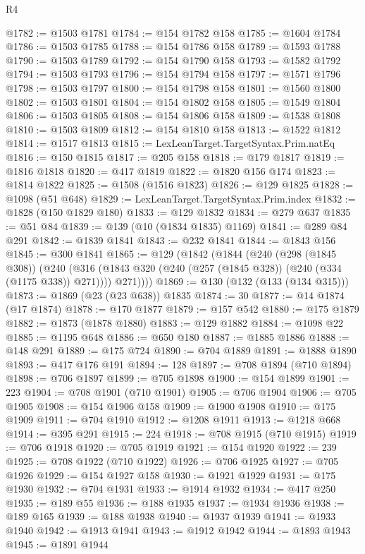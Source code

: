 \begin{lexlean}{R4}
\begin{coremodule}
@1782 := @1503 @1781
@1784 := @154 @1782 @158
@1785 := @1604 @1784
@1786 := @1503 @1785
@1788 := @154 @1786 @158
@1789 := @1593 @1788
@1790 := @1503 @1789
@1792 := @154 @1790 @158
@1793 := @1582 @1792
@1794 := @1503 @1793
@1796 := @154 @1794 @158
@1797 := @1571 @1796
@1798 := @1503 @1797
@1800 := @154 @1798 @158
@1801 := @1560 @1800
@1802 := @1503 @1801
@1804 := @154 @1802 @158
@1805 := @1549 @1804
@1806 := @1503 @1805
@1808 := @154 @1806 @158
@1809 := @1538 @1808
@1810 := @1503 @1809
@1812 := @154 @1810 @158
@1813 := @1522 @1812
@1814 := @1517 @1813
@1815 := LexLeanTarget.TargetSyntax.Prim.natEq
@1816 := @150 @1815
@1817 := @205 @158
@1818 := @179 @1817
@1819 := @1816 @1818
@1820 := @417 @1819
@1822 := @1820 @156 @174
@1823 := @1814 @1822
@1825 := @1508 (@1516 @1823)
@1826 := @129 @1825
@1828 := @1098 (@51 @648)
@1829 := LexLeanTarget.TargetSyntax.Prim.index
@1832 := @1828 (@150 @1829 @180)
@1833 := @129 @1832
@1834 := @279 @637
@1835 := @51 @84
@1839 := @139 (@10 (@1834 @1835) @1169)
@1841 := @289 @84 @291
@1842 := @1839 @1841
@1843 := @232 @1841
@1844 := @1843 @156
@1845 := @300 @1841
@1865 := @129
    (@1842
      (@1844
        (@240
          (@298 (@1845 @308))
          (@240
            (@316 (@1843 @320 (@240 (@257 (@1845 @328)) (@240 (@334 (@1175 @338)) @271))))
            @271))))
@1869 := @130 (@132 (@133 (@134 @315)))
@1873 := @1869 (@23 (@23 @638)) @1835
@1874 := 30
@1877 := @14 @1874 (@17 @1874)
@1878 := @170 @1877
@1879 := @157 @542
@1880 := @175 @1879
@1882 := @1873 (@1878 @1880)
@1883 := @129 @1882
@1884 := @1098 @22
@1885 := @1195 @648
@1886 := @650 @180
@1887 := @1885 @1886
@1888 := @148 @291
@1889 := @175 @724
@1890 := @704 @1889
@1891 := @1888 @1890
@1893 := @417 @176 @191
@1894 := 128
@1897 := @708 @1894 (@710 @1894)
@1898 := @706 @1897
@1899 := @705 @1898
@1900 := @154 @1899
@1901 := 223
@1904 := @708 @1901 (@710 @1901)
@1905 := @706 @1904
@1906 := @705 @1905
@1908 := @154 @1906 @158
@1909 := @1900 @1908
@1910 := @175 @1909
@1911 := @704 @1910
@1912 := @1208 @1911
@1913 := @1218 @668
@1914 := @395 @291
@1915 := 224
@1918 := @708 @1915 (@710 @1915)
@1919 := @706 @1918
@1920 := @705 @1919
@1921 := @154 @1920
@1922 := 239
@1925 := @708 @1922 (@710 @1922)
@1926 := @706 @1925
@1927 := @705 @1926
@1929 := @154 @1927 @158
@1930 := @1921 @1929
@1931 := @175 @1930
@1932 := @704 @1931
@1933 := @1914 @1932
@1934 := @417 @250
@1935 := @189 @55
@1936 := @188 @1935
@1937 := @1934 @1936
@1938 := @189 @165
@1939 := @188 @1938
@1940 := @1937 @1939
@1941 := @1933 @1940
@1942 := @1913 @1941
@1943 := @1912 @1942
@1944 := @1893 @1943
@1945 := @1891 @1944

\end{coremodule}
\end{lexlean}
